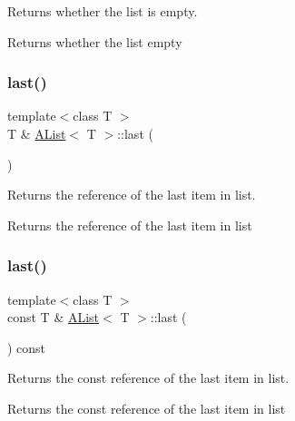 Returns whether the list is empty. 

\begin{DoxyReturn}{Returns}
whether the list empty 
\end{DoxyReturn}
\mbox{\label{class_a_list_a41b07290930bbfa06ec02f9106a52b74}} 
\subsubsection{\texorpdfstring{last()}{last()}\hspace{0.1cm}{\footnotesize\ttfamily [1/2]}}
{\footnotesize\ttfamily template$<$class T $>$ \\
T \& \mbox{\hyperlink{class_a_list}{A\+List}}$<$ T $>$\+::last (\begin{DoxyParamCaption}{ }\end{DoxyParamCaption})}



Returns the reference of the last item in list. 

\begin{DoxyReturn}{Returns}
the reference of the last item in list 
\end{DoxyReturn}
\mbox{\label{class_a_list_ab6c0fc542c318f68199ef3b4d97c82f4}} 
\subsubsection{\texorpdfstring{last()}{last()}\hspace{0.1cm}{\footnotesize\ttfamily [2/2]}}
{\footnotesize\ttfamily template$<$class T $>$ \\
const T \& \mbox{\hyperlink{class_a_list}{A\+List}}$<$ T $>$\+::last (\begin{DoxyParamCaption}{ }\end{DoxyParamCaption}) const}



Returns the const reference of the last item in list. 

\begin{DoxyReturn}{Returns}
the const reference of the last item in list 
\end{DoxyReturn}
\mbox{\label{class_a_list_a67fa7988c05a3e5ef971ca6af77b2381}} 
